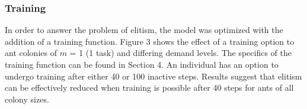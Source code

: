 \documentclass[a4paper]{article}
\begin{document}
\begin{figure}[!ht]
\end{figure}


\subsubsection {Training}

In order to answer the problem of elitism, the model was optimized with the addition of a training function. Figure 3 shows the effect of a training option to ant colonies of $m$ = 1 (1 task) and differing demand levels.  The specifics of the training function can be found in Section 4. An individual has an option to undergo training after either 40 or 100 inactive steps. Results suggest that elitism can be effectively reduced when training is possible after 40 steps for ants of all colony sizes.   
\end{document}
